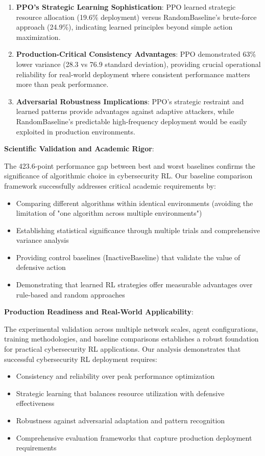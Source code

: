 \documentclass[12pt,twoside]{article}
\begin{document}
\begin{enumerate}
\item \textbf{PPO's Strategic Learning Sophistication}: PPO learned strategic resource allocation (19.6\% deployment) versus RandomBaseline's brute-force approach (24.9\%), indicating learned principles beyond simple action maximization.

\item \textbf{Production-Critical Consistency Advantages}: PPO demonstrated 63\% lower variance (28.3 vs 76.9 standard deviation), providing crucial operational reliability for real-world deployment where consistent performance matters more than peak performance.

\item \textbf{Adversarial Robustness Implications}: PPO's strategic restraint and learned patterns provide advantages against adaptive attackers, while RandomBaseline's predictable high-frequency deployment would be easily exploited in production environments.
\end{enumerate}

\textbf{Scientific Validation and Academic Rigor}:

The 423.6-point performance gap between best and worst baselines confirms the significance of algorithmic choice in cybersecurity RL. Our baseline comparison framework successfully addresses critical academic requirements by:
\begin{itemize}
\item Comparing different algorithms within identical environments (avoiding the limitation of "one algorithm across multiple environments")
\item Establishing statistical significance through multiple trials and comprehensive variance analysis
\item Providing control baselines (InactiveBaseline) that validate the value of defensive action
\item Demonstrating that learned RL strategies offer measurable advantages over rule-based and random approaches
\end{itemize}

\textbf{Production Readiness and Real-World Applicability}:

The experimental validation across multiple network scales, agent configurations, training methodologies, and baseline comparisons establishes a robust foundation for practical cybersecurity RL applications. Our analysis demonstrates that successful cybersecurity RL deployment requires:
\begin{itemize}
\item Consistency and reliability over peak performance optimization
\item Strategic learning that balances resource utilization with defensive effectiveness
\item Robustness against adversarial adaptation and pattern recognition
\item Comprehensive evaluation frameworks that capture production deployment requirements
\end{itemize}
\end{document}
